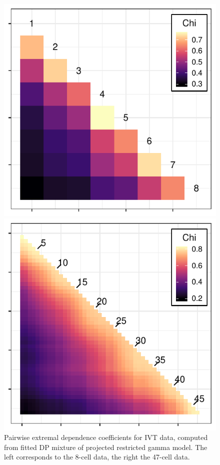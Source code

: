   \begin{figure}[ht!]
    \centering
    \label{fig:chi_ij}
    \begin{minipage}{.49\textwidth}
      \centering
      \includegraphics[width=0.99\linewidth]{./images/chi_ij_8}
    \end{minipage}
    \begin{minipage}{.49\textwidth}
      \centering
      \includegraphics[width=0.99\linewidth]{./images/chi_ij_46}
    \end{minipage}
    \caption{Pairwise extremal dependence coefficients for IVT data, computed from fitted DP mixture
      of projected restricted gamma model.  The left corresponds to the 8-cell data, the right the
      47-cell data.}
  \end{figure}


